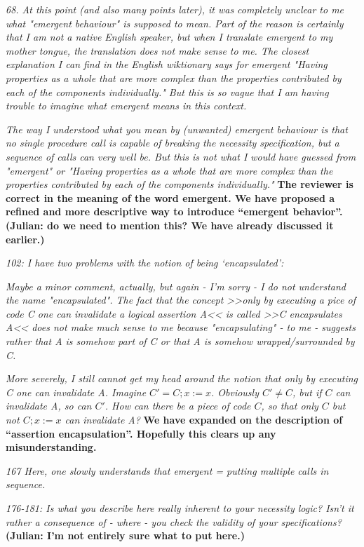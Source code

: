 \documentclass[11pt]{amsart}
\newcommand{\rev}[1]{\emph #1}
\newcommand{\us}[1]{\bf #1}
\begin{document}
{\rev {{ 68. At this point (and also many points later), it was completely unclear to me what "emergent behaviour" is supposed to mean. Part of the reason is certainly that I am not a native English speaker, but when I translate emergent to my mother tongue, the translation does not make sense to me. The closest explanation I can find in the English wiktionary says for emergent "Having properties as a whole that are more complex than the properties contributed by each of the components individually." But this is so vague that I am having trouble to imagine what emergent means in this context.}}}

{\rev {{    The way I understood what you mean by (unwanted) emergent behaviour is that no single procedure call is capable of breaking the necessity specification, but a sequence of calls can very well be. But this is not what I would have guessed from "emergent" or "Having properties as a whole that are more complex than the properties contributed by each of the components individually." }}}
{\us{The reviewer is correct in the meaning of the word emergent. We have proposed a refined and more descriptive way to introduce ``emergent behavior''. 
(Julian: do we need to mention this? We have already discussed it earlier.)}}

{\rev {{102: I have two problems with the notion of being  `encapsulated': }}}

{\rev {{ Maybe a minor comment, actually, but again - I'm sorry - I do not understand the name "encapsulated". The fact that the concept >>only by executing a pice of code C one can invalidate a logical assertion A<< is called >>C encapsulates A<< does not make much sense to me because "encapsulating" - to me - suggests rather that A is somehow part of C or that A is somehow wrapped/surrounded by C. }}}

{\rev {{ More severely, I still cannot get my head around the notion that only by executing C one can invalidate A. Imagine $C' = C; x:=x$. Obviously $C' \neq C$, but if $C$ can invalidate A, so can $C'$. How can there be a piece of code $C$, so that only $C$ but not $C; x:=x$ can invalidate A? }}}
{\us{We have expanded on the description of ``assertion encapsulation''. Hopefully this clears up any misunderstanding.}}

{\rev {{167 Here, one slowly understands that emergent = putting multiple calls in sequence. }}}

{\rev {{176-181: Is what you describe here really inherent to your necessity logic? Isn't it rather a consequence of - where - you check the validity of your specifications? }}}
{\us{{(Julian: I'm not entirely sure what to put here.)}}}
\end{document}
